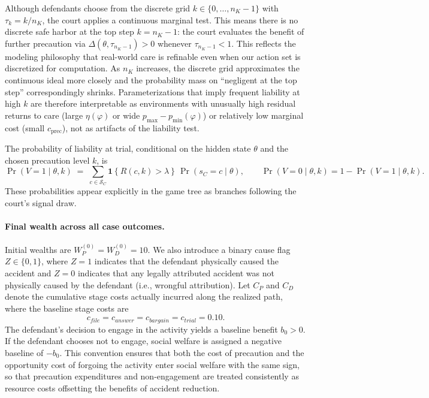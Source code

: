 \documentclass{article}
\begin{document}
Although defendants choose from the discrete grid $k\in\{0,\dots,n_K-1\}$ with $\tau_k=k/n_K$, the court applies a continuous marginal test. This means there is no discrete safe harbor at the top step $k=n_K-1$: the court evaluates the benefit of further precaution via $\Delta(\theta,\tau_{n_K-1})>0$ whenever $\tau_{n_K-1}<1$. This reflects the modeling philosophy that real-world care is refinable even when our action set is discretized for computation. As $n_K$ increases, the discrete grid approximates the continuous ideal more closely and the probability mass on “negligent at the top step” correspondingly shrinks. Parameterizations that imply frequent liability at high $k$ are therefore interpretable as environments with unusually high residual returns to care (large $\eta(\varphi)$ or wide $p_{\max}-p_{\min}(\varphi)$) or relatively low marginal cost (small $c_{\mathrm{prec}}$), not as artifacts of the liability test.


The probability of liability at trial, conditional on the hidden state $\theta$ and the chosen precaution level $k$, is
\[
\Pr(V=1\mid \theta,k)\;=\;\sum_{c\in\mathcal{S}_C}\mathbf{1}\!\left\{R(c,k)>\lambda\right\}\,\Pr(s_C=c\mid \theta),
\qquad
\Pr(V=0\mid \theta,k)=1-\Pr(V=1\mid \theta,k).
\]
These probabilities appear explicitly in the game tree as branches following the court’s signal draw.

\paragraph{Final wealth across all case outcomes.}
Initial wealths are $W_P^{(0)}=W_D^{(0)}=10$. We also introduce a binary cause flag $Z\in\{0,1\}$, where $Z=1$ indicates that the defendant physically caused the accident and $Z=0$ indicates that any legally attributed accident was not physically caused by the defendant (i.e., wrongful attribution). Let $C_P$ and $C_D$ denote the cumulative stage costs actually incurred along the realized path, where the baseline stage costs are
\[
c_{file}=c_{answer}=c_{bargain}=c_{trial}=0.10.
\]
The defendant’s decision to engage in the activity yields a baseline benefit $b_0>0$. If the defendant chooses not to engage, social welfare is assigned a negative baseline of $-b_0$. This convention ensures that both the cost of precaution and the opportunity cost of forgoing the activity enter social welfare with the same sign, so that precaution expenditures and non-engagement are treated consistently as resource costs offsetting the benefits of accident reduction.
\end{document}
